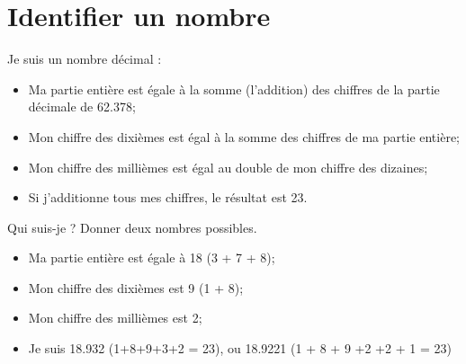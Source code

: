 \section{Identifier un nombre}

Je suis un nombre décimal :
\begin{itemize}
	\item Ma partie entière est égale à la somme (l'addition) des chiffres de la partie décimale de \num{62.378};
	\item Mon chiffre des dixièmes est égal à la somme des chiffres de ma partie entière;
	\item Mon chiffre des millièmes est égal au double de mon chiffre des dizaines;
	\item Si j'additionne tous mes chiffres, le résultat est 23.
	
\end{itemize}

\begin{questions}
	\question Qui suis-je ? Donner deux nombres possibles.
	
	\begin{solution}
		\begin{itemize}
			\item Ma partie entière est égale à 18 (3 +  7 + 8);
			\item Mon chiffre des dixièmes est 9 (1 + 8);
			\item Mon chiffre des millièmes est 2;
			\item Je suis \num{18.932} (1+8+9+3+2 = 23), ou \num{18.9221} (1 + 8 + 9 +2 +2 + 1 = 23)
		\end{itemize}
	
	
	\end{solution}
\end{questions}